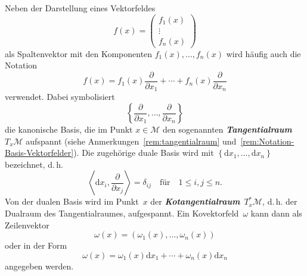 Neben der Darstellung eines Vektorfeldes
\[
f(x)=\left(\begin{array}{c}
f_{1}(x)\\
\vdots\\
f_{n}(x)
\end{array}\right)
\]
als Spaltenvektor mit den Komponenten $f_{1}(x),\ldots,f_{n}(x)$
wird häufig auch die Notation
\begin{equation}
f(x)=f_{1}(x)\frac{\partial}{\partial x_{1}}+\cdots+f_{n}(x)\frac{\partial}{\partial x_{n}}\label{eq:Basisdarstellung-Vektorfelder}
\end{equation}
verwendet. Dabei symbolisiert
\begin{equation}
\left\{ \frac{\partial}{\partial x_{1}},\ldots,\frac{\partial}{\partial x_{n}}\right\} \label{eq:Basisvektorfelder}
\end{equation}
die kanonische Basis, die im Punkt $x\in\mathcal{M}$ den sogenannten
\textbf{\em Tangential\-raum}~$T_{x}\mathcal{M}$
aufspannt (siehe Anmerkungen~\ref{rem:tangentialraum} und~\ref{rem:Notation-Basis-Vektorfelder}).
Die zugehörige duale Basis wird mit $\left\{ {\mathrm{d}} x_{1},\dots,{\mathrm{d}} x_{n}\right\} $
bezeichnet, d.\,h.
\[
\left\langle {\mathrm{d}} x_{i},\frac{\partial}{\partial x_{j}}\right\rangle =\delta_{ij}\quad\textrm{für}\quad1\leq i,j\leq n.
\]
Von der dualen Basis wird im Punkt~$x$ der \textbf{\em Kotangential\-raum}~$T_{x}^{*}\mathcal{M}$,
d.\,h. der Dualraum des Tangentialraumes, aufgespannt. Ein Kovektorfeld~$\omega$
kann dann als Zeilenvektor
\[
\omega(x)=\left(\omega_{1}(x),\ldots,\omega_{n}(x)\right)
\]
oder in der Form
\begin{equation}
\omega(x)=\omega_{1}(x){\mathrm{d}} x_{1}+\cdots+\omega_{n}(x){\mathrm{d}} x_{n}\label{eq:Basisdarstellung-Kovektorfelder}
\end{equation}
angegeben werden.
